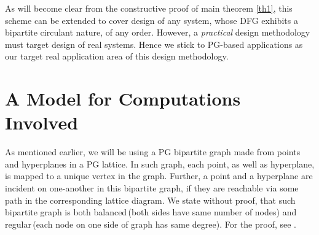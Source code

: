 \documentclass[12pt]{article}
\begin{document}
As will become clear from the constructive proof of main theorem \ref{th1},
this scheme can be extended to cover design of any system, whose DFG
exhibits a bipartite circulant nature, of any order.  However, a
\textit{practical} design methodology must target design of real systems.
Hence we stick to PG-based applications as our target real application area
of this design methodology.

\section{A Model for Computations Involved}
\label{comp_model_sec}
As mentioned earlier, we will be using a PG bipartite graph made from
points and hyperplanes in a PG lattice. In such graph, each point,
as well as hyperplane, is mapped to a unique vertex in the graph. Further,
a point and a hyperplane are
incident on one-another in this bipartite graph, if they are reachable via
some path in the corresponding lattice diagram. We state without proof,
that such bipartite graph is both balanced\,(both sides have same number of
nodes) and regular\,(each node on one side of graph has same
degree). For the proof, see \cite{hrishi_thesis}.
\end{document}
